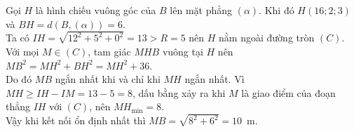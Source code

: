 \begin{ex}
{\begin{itemchoice}
\begin{center}
				\end{center}
				Gọi $H$ là hình chiếu vuông góc của $B$ lên mặt phẳng $(\alpha)$. Khi đó $H(16;2;3)$ và $BH=d\left(B,(\alpha)\right)=6$.\\
				Ta có $IH=\sqrt{12^2+5^2+0^2}=13 > R=5$ nên $H$ nằm ngoài đường tròn $(C)$.\\
				Với mọi $M\in(C)$, tam giác $MHB$ vuông tại $H$ nên $MB^2=MH^2+BH^2=MH^2+36$.\\
				Do đó $MB$ ngắn nhất khi và chỉ khi $MH$ ngắn nhất. Vì $MH\geq IH-IM=13-5=8$, dấu bằng xảy ra khi $M$ là giao điểm của đoạn thẳng $IH$ với $(C)$, nên $MH_{\min}=8$.\\
				Vậy khi kết nối ổn định nhất thì $MB=\sqrt{8^2+6^2}=10$~m.
			\end{itemchoice}
		}
	\end{ex}
	
